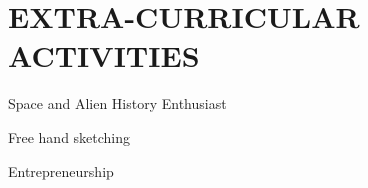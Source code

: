 \documentclass[]{space-monkey-cv}
\begin{document}


\section{EXTRA-CURRICULAR ACTIVITIES}

\begin{skill-env}
	\item Space and Alien History Enthusiast 
	\item Free hand sketching
	\item Entrepreneurship
\end{skill-env}
\sectionsep




\sectionsep
\end{document}
